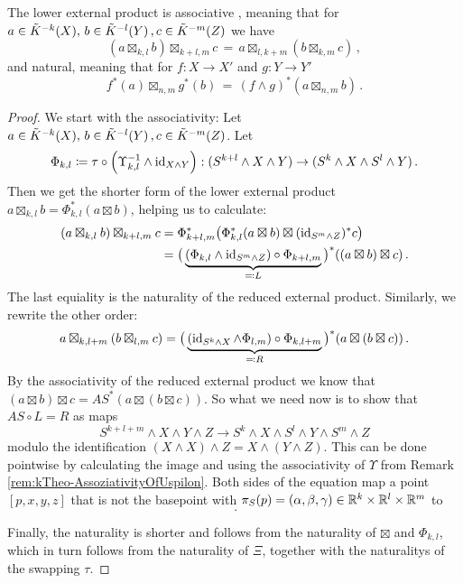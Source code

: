 \begin{remark}
	The lower external product is associative , meaning that for $a\in \tilde{K}^{-k}(X),\,b\in \tilde{K}^{-l}(Y)\,,c\in \tilde{K}^{-m}(Z)$ we have
	\begin{equation*}
		(a\boxtimes_{k,l}b)\boxtimes_{k+l,m}c\,=\,a\boxtimes_{l,k+m}(b\boxtimes_{k,m}c)\,,
	\end{equation*}
	and natural, meaning that for $f:X\to X'$ and $g:Y\to Y'$
	\begin{equation*}
		f^*(a)\boxtimes_{n,m}g^*(b)\,=\, (f\wedge g)^*(a \boxtimes_{n,m} b)\,.
	\end{equation*}
\end{remark}
\begin{proof}
	We start with the associativity: Let $a\in \tilde{K}^{-k}(X),\,b\in \tilde{K}^{-l}(Y)\,,c\in \tilde{K}^{-m}(Z)$. Let
	\begin{equation*}
		\Phi_{k,l}\coloneq \tau\circ \left(\Upsilon^{-1}_{k,l}\wedge \operatorname{\mathrm{id}}_{X\wedge Y}\right):(S^{k+l}\wedge X\wedge Y)\to (S^k\wedge X \wedge S^l \wedge Y)\,.
	\end{equation*}
	Then we get the shorter form of the lower external product $a\boxtimes_{k,l}b=\Phi_{k,l}^*(a\boxtimes b)$, helping us to calculate:
\begin{align*}
	(a\boxtimes_{k,l}b)\boxtimes_{k+l,m}c 
		&=\Phi_{k+l,m}^*\big(\Phi_{k,l}^*(a\boxtimes b)\boxtimes (\operatorname{\mathrm{id}}_{S^m\wedge Z})^*c\big)\\
		&=\big(\underbrace{(\Phi_{k,l}\wedge \operatorname{\mathrm{id}}_{S^m\wedge Z})\circ \Phi_{k+l,m}}_{\eqcolon L}\big)^*((a\boxtimes b)\boxtimes c)\,.
\end{align*} The last equiality is the naturality of the reduced external product.
Similarly, we rewrite the other order:
\begin{equation*}
	a\boxtimes_{k,l+m}(b\boxtimes_{l,m}c)=\big(\underbrace{(\operatorname{\mathrm{id}}_{S^k\wedge X}\wedge \Phi_{l,m})\circ \Phi_{k,l+m}}_{\eqcolon R}\big)^*(a\boxtimes (b\boxtimes c))\,.
\end{equation*}
By the associativity of the reduced external product we know that $(a\boxtimes b)\boxtimes c=AS^*(a\boxtimes (b\boxtimes c))$. 
So what we need now is to show that $AS\circ L=R$ as maps 
\begin{equation*}
	S^{k+l+m}\wedge X\wedge Y \wedge Z\to S^k\wedge X\wedge S^l \wedge Y\wedge S^m\wedge Z
\end{equation*} modulo the identification $(X\wedge X)\wedge Z=X\wedge (Y\wedge Z)$. This can be done pointwise by calculating the image and using the associativity of $\Upsilon$ from Remark \ref{rem:kTheo-AssoziativityOfUspilon}. Both sides of the equation map a point $[p,x,y,z]$ that is not the basepoint with $\pi_S(p)=(\alpha,\beta,\gamma)\in \mathbb{R}^k\times \mathbb{R}^l\times \mathbb{R}^m$ to
\begin{equation*}
	[\pi^{-1}_S (\alpha),x,\pi_S^{-1}(\beta),y,\pi_S^{-1}(\gamma),z]\,.
\end{equation*}

Finally, the naturality is shorter and follows from the naturality of $\boxtimes$ and $\Phi_{k,l}$, which in turn follows from the naturality of $\Xi$, together with the naturalitys of the swapping $\tau$.
\end{proof}


